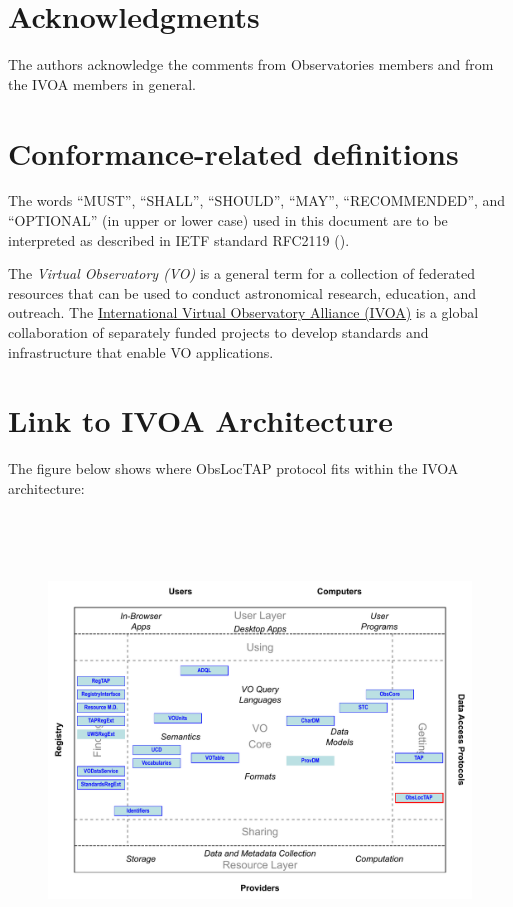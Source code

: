 \documentclass[11pt,a4paper]{ivoa}
\begin{document}
\section*{Acknowledgments}
The authors acknowledge the comments from Observatories members and from the IVOA 
members in general.


\section*{Conformance-related definitions}

The words ``MUST'', ``SHALL'', ``SHOULD'', ``MAY'', ``RECOMMENDED'', and
``OPTIONAL'' (in upper or lower case) used in this document are to be
interpreted as described in IETF standard RFC2119 (\citep{std:RFC2119}).

The \emph{Virtual Observatory (VO)} is a
general term for a collection of federated resources that can be used
to conduct astronomical research, education, and outreach.
The \href{http://www.ivoa.net}{International
Virtual Observatory Alliance (IVOA)} is a global
collaboration of separately funded projects to develop standards and
infrastructure that enable VO applications.

\section*{Link to IVOA Architecture}
The figure below shows where ObsLocTAP protocol fits within the IVOA architecture:


\begin{figure}[H]
\advance\leftskip 0.0in	\includegraphics[width=6.0in,height=4.73in]{./role_diagram.pdf}
\end{figure}
\end{document}

